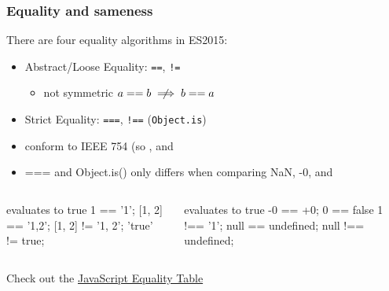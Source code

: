 \begin{frame}[fragile]
  \frametitle{Equality and sameness}
  There are four equality algorithms in ES2015:
  \begin{itemize}
    \item Abstract/Loose Equality: \verb|==|, \verb|!=|
    \begin{itemize}
      \item not symmetric  $a==b \centernot \implies b==a$
    \end{itemize}
    \item Strict Equality: \verb|===|, \verb|!==| (\verb|Object.is|)
    \item conform to IEEE 754 (so , and 
    \item === and Object.is() only differs when comparing {NaN, -0,} and 
  \end{itemize}
\begin{columns}[onlytextwidth]
  \begin{column}{0.45\textwidth}
\begin{CodeBox}{evaluates to true}
  1 == '1';
  [1, 2] == '1,2';
  [1, 2] != '1, 2';
  'true' != true;
\end{CodeBox}
  \end{column}
  \begin{column}{0.45\textwidth}
\begin{CodeBox}{evaluates to true}
  -0 == +0;
  0 == false
  1 !== '1';
  null == undefined;
  null !== undefined;
\end{CodeBox}
  \end{column}
  \begin{column}{0.3\textwidth}  \end{column}
\end{columns}%
Check out the \href{https://dorey.github.io/JavaScript-Equality-Table/}{JavaScript Equality Table} 
\end{frame}
